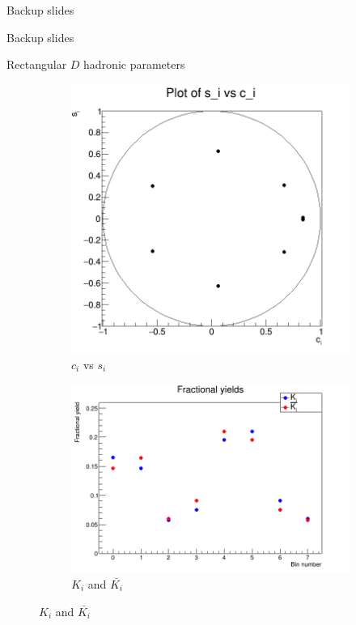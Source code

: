 \documentclass{beamer}
\begin{document}
\begin{frame}{Backup slides}
  \begin{center}
    Backup slides
  \end{center}
\end{frame}

\begin{frame}{Rectangular $D$ hadronic parameters}
  \begin{figure}
    \centering
    \vspace{-0.2cm}
    \begin{subfigure}{0.5\textwidth}
      \includegraphics[width = 1.0\textwidth]{SophisticatedX3X4Grid_8bins_2binregions_95regions_cs.png}
      \caption{$c_i$ vs $s_i$}
    \end{subfigure}%
    \begin{subfigure}{0.5\textwidth}
      \includegraphics[width = 1.0\textwidth]{SophisticatedX3X4Grid_8bins_2binregions_95regions_KKbar.png}
      \caption{$K_i$ and $\bar{K_i}$}
    \end{subfigure}
  \end{figure}
\end{frame}
\end{document}
